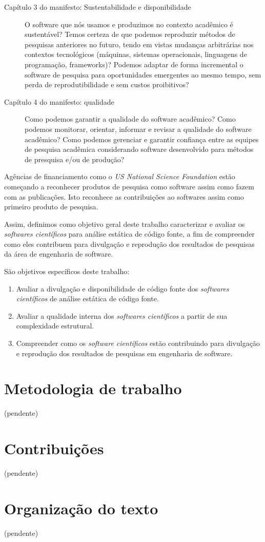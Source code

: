 \begin{description}

  \item [Capítulo 3 do manifesto: Sustentabilidade e disponibilidade]

    O software que nós usamos e produzimos no contexto acadêmico é sustentável?
    Temos certeza de que podemos reproduzir métodos de pesquisas anteriores no
    futuro, tendo em vistas mudanças arbitrárias nos contextos tecnológicos
    (máquinas, sistemas operacionais, linguagens de programação, frameworks)?
    Podemos adaptar de forma incremental o software de pesquisa para
    oportunidades emergentes ao mesmo tempo, sem perda de reprodutibilidade e
    sem custos proibitivos?

  \item [Capítulo 4 do manifesto: qualidade]

    Como podemos garantir a qualidade do software acadêmico? Como podemos
    monitorar, orientar, informar e revisar a qualidade do software acadêmico?
    Como podemos gerenciar e garantir confiança entre as equipes de pesquisa
    acadêmica considerando software desenvolvido para métodos de presquisa e/ou
    de produção?

\end{description}

Agências de financiamento como o {\it US National Science Foundation} estão começando
a reconhecer produtos de pesquisa como software assim como fazem com as publicações.
Isto reconhece as contribuições ao softwares assim como primeiro produto de pesquisa.

Assim, definimos como objetivo geral deste trabalho caracterizar e avaliar os
{\it softwares científicos} para análise estática de código fonte, a fim de
compreender como eles contribuem para divulgação e reprodução dos resultados de
pesquisas da área de engenharia de software.

São objetivos específicos deste trabalho:

\begin{enumerate}
  \item Avaliar a divulgação e disponibilidade de código fonte dos {\it softwares científicos} de análise estática de código fonte.
  \item Avaliar a qualidade interna dos {\it softwares científicos} a partir de sua complexidade estrutural.
  \item Compreender como os {\it software científicos} estão contribuindo para divulgação e reprodução dos resultados de pesquisas em engenharia de software.
\end{enumerate}

\section{Metodologia de trabalho}

(pendente)

\section{Contribuições}

(pendente)

\section{Organização do texto}

(pendente)
